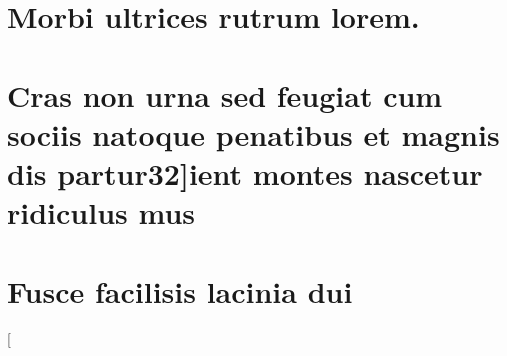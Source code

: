 \chapter{Morbi ultrices rutrum lorem.}

\lipsum[30]

\chapter{Cras non urna sed feugiat cum sociis natoque penatibus et magnis dis
partur32]ient montes nascetur ridiculus mus}

\lipsum[31]

\chapter{Fusce facilisis lacinia dui}

\lipsum[